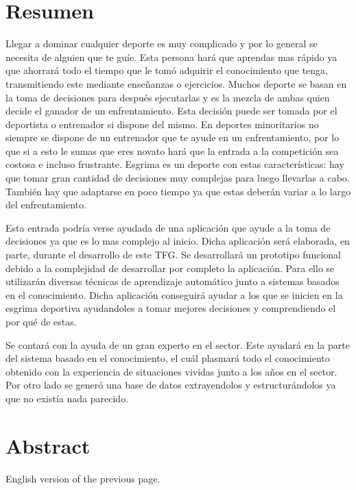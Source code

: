 \chapter{Resumen}

Llegar a dominar cualquier deporte es muy complicado y por lo general se necesita
de alguien que te guíe. Esta persona hará que aprendas mas rápido ya que ahorrará
todo el tiempo que le tomó adquirir el conocimiento que tenga, transmitiendo este
mediante enseñanzas o ejercicios. Muchos deporte se basan en la toma de decisiones
para después ejecutarlas y es la mezcla de ambas quien decide el ganador de un
enfrentamiento. Esta decisión puede ser tomada por el deportista o entrenador si
dispone del mismo.
En deportes minoritarios no siempre se dispone de un entrenador que te ayude
en un enfrentamiento, por lo que si a esto le sumas que eres novato hará
que la entrada a la competición sea costosa e incluso frustrante. Esgrima
es un deporte con estas características: hay que tomar gran cantidad de decisiones
muy complejas para luego llevarlas a cabo. También hay que adaptarse en poco tiempo
ya que estas deberán variar a lo largo del enfrentamiento.


Esta entrada podría verse ayudada de una aplicación que ayude a la toma
de decisiones ya que es lo mas complejo al inicio. Dicha aplicación será elaborada,
en parte, durante el desarrollo de este \acf{TFG}. Se desarrollará un
prototipo funcional debido a la complejidad de desarrollar por completo la aplicación.
Para ello se utilizarán diversas técnicas de aprendizaje automático junto a sistemas
basados en el conocimiento. Dicha aplicación conseguirá ayudar a los que
se inicien en la esgrima deportiva ayudandoles a tomar mejores decisiones y comprendiendo
el por qué de estas.

Se contará con la ayuda de un gran experto en el sector. Este ayudará
en la parte del sistema basado en el conocimiento, el cuál plasmará todo el conocimiento
obtenido con la experiencia de situaciones vividas junto a los años en el sector. Por
otro lado se generó una base de datos extrayendolos y estructurándolos ya que no
existía nada parecido.

\chapter{Abstract}

English version of the previous page.

